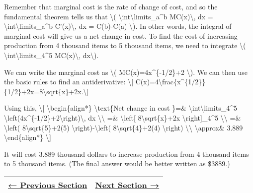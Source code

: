 Remember that marginal cost is the rate of change of cost, and so the
fundamental theorem tells us that \textbackslash{}(
\textbackslash{}int\textbackslash{}limits\_a\^{}b MC(x)\textbackslash{},
dx = \textbackslash{}int\textbackslash{}limits\_a\^{}b
C'(x)\textbackslash{}, dx = C(b)-C(a) \textbackslash{}). In other words,
the integral of marginal cost will give us a net change in cost. To find
the cost of increasing production from 4 thousand items to 5 thousand
items, we need to integrate \textbackslash{}(
\textbackslash{}int\textbackslash{}limits\_4\^{}5 MC(x)\textbackslash{},
dx\textbackslash{}).

We can write the marginal cost as \textbackslash{}(
MC(x)=4x\^{}\{-1/2\}+2 \textbackslash{}). We can then use the basic
rules to find an antiderivative: \textbackslash{}{[}
C(x)=4\textbackslash{}frac\{x\^{}\{1/2\}\}\{1/2\}+2x=8\textbackslash{}sqrt\{x\}+2x.\textbackslash{}{]}

Using this, \textbackslash{}{[} \textbackslash{}begin\{align*\}
\textbackslash{}text\{Net change in cost \}=\&
\textbackslash{}int\textbackslash{}limits\_4\^{}5
\textbackslash{}left(4x\^{}\{-1/2\}+2\textbackslash{}right)\textbackslash{},
dx \textbackslash{}\textbackslash{} =\& \textbackslash{}left{[}
8\textbackslash{}sqrt\{x\}+2x \textbackslash{}right{]}\_4\^{}5
\textbackslash{}\textbackslash{} =\& \textbackslash{}left(
8\textbackslash{}sqrt\{5\}+2(5)
\textbackslash{}right)-\textbackslash{}left(
8\textbackslash{}sqrt\{4\}+2(4) \textbackslash{}right)
\textbackslash{}\textbackslash{} \textbackslash{}approx\& 3.889
\textbackslash{}end\{align*\} \textbackslash{}{]}

It will cost 3.889 thousand dollars to increase production from 4
thousand items to 5 thousand items. (The final answer would be better
written as \$3889.)

\begin{longtable}[]{@{}ll@{}}
\toprule
\endhead
\href{section3-2.php}{← Previous Section} & \href{section3-4.php}{Next
Section →}\tabularnewline
\bottomrule
\end{longtable}
